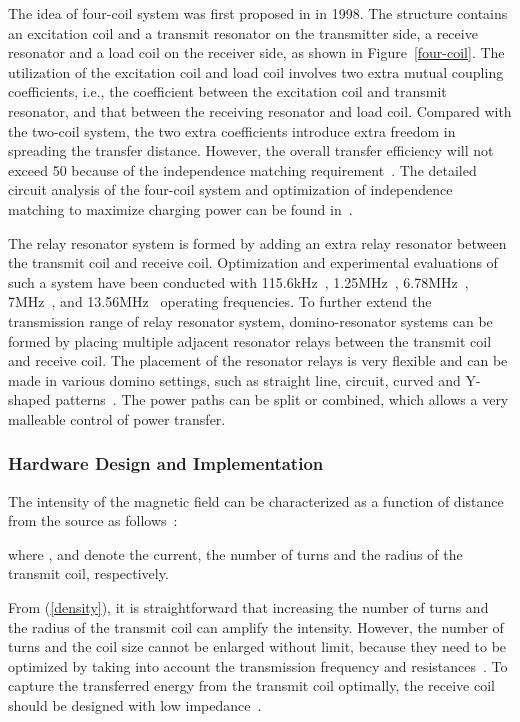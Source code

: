 \documentclass[twocolumn,10pt]{IEEEtran}
\begin{document}
The idea of four-coil system was first proposed in \cite{T.1998Boys} in 1998. The structure contains an excitation coil and a transmit resonator on the transmitter side, a receive resonator and a load coil on the receiver side, as shown in Figure~\ref{four-coil}. The utilization of the excitation coil and load coil involves two extra mutual coupling coefficients, i.e., the coefficient between the excitation coil and transmit resonator, and that between the receiving resonator and load coil. Compared with the two-coil system, the two extra coefficients introduce extra freedom in spreading the transfer distance. However, the overall transfer efficiency will not exceed 50 because of the independence matching requirement~\cite{S.2011Cheon}. The detailed circuit analysis of the four-coil system and optimization of independence matching to maximize charging power can be found in~\cite{S.2011Cheon}.


The relay resonator system is formed by adding an extra relay resonator between the transmit coil and receive coil. Optimization and experimental evaluations of such a system have been conducted with 115.6kHz~\cite{X.2015Zhong}, 1.25MHz~\cite{W.2011Kim}, 6.78MHz~\cite{Y.2012Kim}, 7MHz~\cite{F.2011Zhang}, and 13.56MHz~\cite{M.2011Kiani} operating frequencies.  
To further extend the transmission range of relay resonator system, domino-resonator systems can be formed by placing multiple adjacent resonator relays between the transmit coil and receive coil. The placement of the resonator relays is very flexible and can be made in various domino settings, such as straight line, circuit, curved and Y-shaped  patterns~\cite{X.2012Zhong,K.2012Lee,W.2013Zhong}.
The power paths can be split or combined, which allows a very malleable control of power transfer.  

 


\subsubsection{Hardware Design and Implementation}
The intensity of the magnetic field can be characterized as a function of distance  from the source as follows~\cite{I.2013Mayordomo}:

where ,  and  denote the current, the number of turns and the radius of the transmit coil, respectively.

From (\ref{density}), it is straightforward that increasing the number of turns and the radius of the transmit coil can amplify the intensity. However, the number of turns and the coil size cannot be enlarged without limit, because they need to be optimized by taking into account the transmission frequency and resistances~\cite{I.2013Mayordomo}. To capture the transferred energy from the transmit coil optimally, the receive coil should be designed with low impedance~\cite{W.2012Kim}.  
\end{document}
